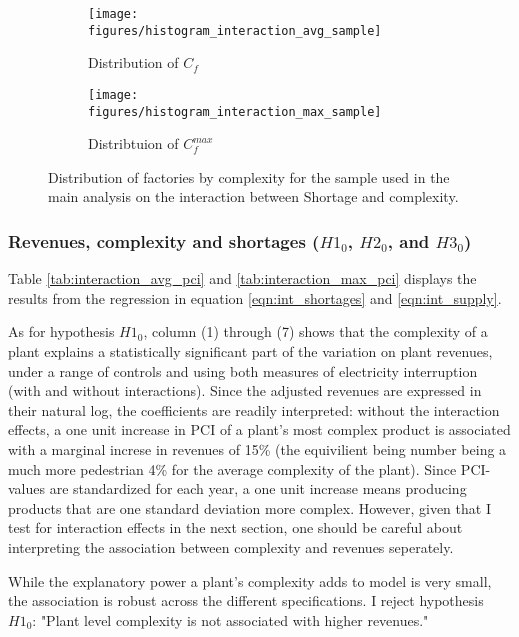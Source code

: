 \documentclass[11pt]{article}
\begin{document}
\begin{figure}
     \centering
     \begin{subfigure}[b]{0.45\textwidth}
         \centering
         \texttt{[image: figures/histogram\_interaction\_avg\_sample]}
	 \caption{Distribution of $C_f$}
         \label{fig:interaction_sample_avg}
     \end{subfigure}
     \hfill
     \begin{subfigure}[b]{0.45\textwidth}
         \centering
         \texttt{[image: figures/histogram\_interaction\_max\_sample]}
	 \caption{Distribtuion of $C^{max}_{f}$}
         \label{fig:interaction_sample_max}
     \end{subfigure}
     \caption[Distribution of factories by complexity in interaction sample]{Distribution of factories by complexity for the sample used in the main analysis on the interaction between Shortage and complexity.}
        \label{fig:interaction_sample}
\end{figure}

\subsubsection{Revenues, complexity and shortages ($H1_0$, $H2_0$, and $H3_0$)}
\label{sub:h123}
Table \ref{tab:interaction_avg_pci} and \ref{tab:interaction_max_pci} displays the results from the regression in equation \ref{eqn:int_shortages} and \ref{eqn:int_supply}.

As for hypothesis $H1_0$, column (1) through (7) shows that the complexity of a plant explains a statistically significant part of the variation on plant revenues, under a range of controls and using both measures of electricity interruption (with and without interactions). Since the adjusted revenues are expressed in their natural log, the coefficients are readily interpreted: without the interaction effects, a one unit increase in PCI of a plant's most complex product is associated with a marginal increse in revenues of 15\% (the equivilient being number being a much more pedestrian 4\% for the average complexity of the plant). Since PCI-values are standardized for each year, a one unit increase means producing products that are one standard deviation more complex. However, given that I test for interaction effects in the next section, one should be careful about interpreting the association between complexity and revenues seperately. 

While the explanatory power a plant's complexity adds to model is very small, the association is robust across the different specifications. I reject hypothesis $H1_0$: "Plant level complexity is not associated with higher revenues."
\end{document}
